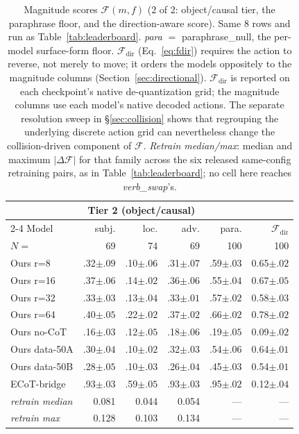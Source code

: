 \begin{table}[t]
\centering\scriptsize
\caption{Magnitude scores $\mathcal{F}(m, f)$ (2 of 2: object/causal tier, the paraphrase floor, and the direction-aware score). Same 8 rows and run as Table~\ref{tab:leaderboard}. \emph{para} $=$ paraphrase\_null, the per-model surface-form floor. $\mathcal{F}_{\text{dir}}$ (Eq.~\ref{eq:fdir}) requires the action to reverse, not merely to move; it orders the models oppositely to the magnitude columns (Section~\ref{sec:directional}). $\mathcal{F}_{\text{dir}}$ is reported on each checkpoint's native de-quantization grid; the magnitude columns use each model's native decoded actions. The separate resolution sweep in \S\ref{sec:collision} shows that regrouping the underlying discrete action grid can nevertheless change the collision-driven component of $\mathcal{F}$. \emph{Retrain median/max}: median and maximum $|\Delta \mathcal{F}|$ for that family across the six released same-config retraining pairs, as in Table~\ref{tab:leaderboard}; no cell here reaches \emph{verb\_swap}'s.}
\label{tab:leaderboard2}
\begin{tabular}{l r r r r r}
\toprule
& \multicolumn{3}{c}{Tier 2 (object/causal)} & & \\
\cmidrule(lr){2-4}
Model & subj. & loc. & adv. & para. & $\mathcal{F}_{\text{dir}}$ \\
$N=$ & 69 & 74 & 69 & 100 & 100 \\
\midrule
Ours r=8       & .32\tiny{$\pm .09$} & .10\tiny{$\pm .06$} & .31\tiny{$\pm .07$} & .59\tiny{$\pm .03$} & 0.65\tiny{$\pm .02$} \\
Ours r=16      & .37\tiny{$\pm .06$} & .14\tiny{$\pm .02$} & .36\tiny{$\pm .06$} & .55\tiny{$\pm .04$} & 0.67\tiny{$\pm .05$} \\
Ours r=32      & .33\tiny{$\pm .03$} & .13\tiny{$\pm .04$} & .33\tiny{$\pm .01$} & .57\tiny{$\pm .02$} & 0.58\tiny{$\pm .03$} \\
Ours r=64      & .40\tiny{$\pm .05$} & .22\tiny{$\pm .02$} & .37\tiny{$\pm .02$} & .66\tiny{$\pm .02$} & 0.78\tiny{$\pm .02$} \\
Ours no-CoT    & .16\tiny{$\pm .03$} & .12\tiny{$\pm .05$} & .18\tiny{$\pm .06$} & .19\tiny{$\pm .05$} & 0.09\tiny{$\pm .02$} \\
Ours data-50A  & .30\tiny{$\pm .04$} & .10\tiny{$\pm .02$} & .32\tiny{$\pm .03$} & .54\tiny{$\pm .06$} & 0.64\tiny{$\pm .01$} \\
Ours data-50B  & .28\tiny{$\pm .05$} & .10\tiny{$\pm .03$} & .26\tiny{$\pm .04$} & .45\tiny{$\pm .03$} & 0.54\tiny{$\pm .01$} \\
ECoT-bridge & .93\tiny{$\pm .03$} & .59\tiny{$\pm .05$} & .93\tiny{$\pm .03$} & .95\tiny{$\pm .02$} & 0.12\tiny{$\pm .04$} \\
\midrule
\emph{retrain median} & 0.081 & 0.044 & 0.054 & --- & --- \\
\emph{retrain max}    & 0.128 & 0.103 & 0.134 & --- & --- \\
\bottomrule
\end{tabular}
\end{table}

